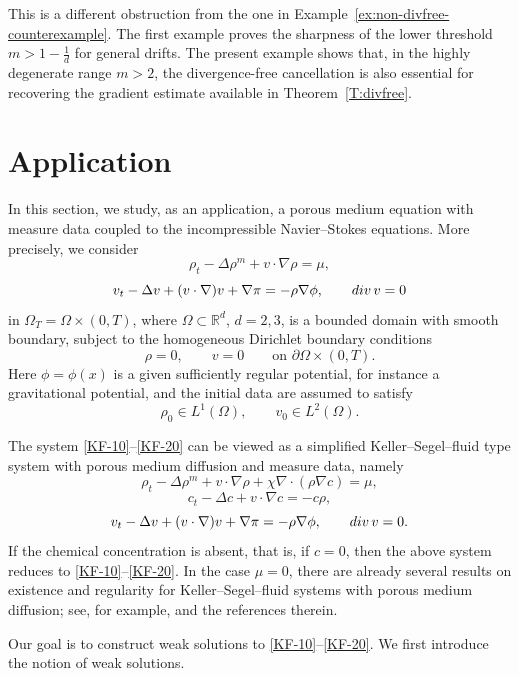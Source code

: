 \documentclass{amsart}
\numberwithin{equation}{section}
\begin{document}
This is a different obstruction from the one in
Example~\ref{ex:non-divfree-counterexample}. The first example proves the
sharpness of the lower threshold \(m>1-\frac{1}{d}\) for general drifts. The
present example shows that, in the highly degenerate range \(m>2\), the
divergence-free cancellation is also essential for recovering the gradient
estimate available in Theorem~\ref{T:divfree}.




\section{Application}\label{S:Application}

In this section, we study, as an application, a porous medium equation with measure data coupled to the incompressible Navier--Stokes equations. More precisely, we consider
\begin{equation}\label{KF-10}
\rho_t-\Delta \rho^m +v\cdot \nabla \rho=\mu,
\end{equation}
\begin{equation}\label{KF-20}
v_t-\Delta v +(v\cdot \nabla) v+\nabla \pi=-\rho\nabla\phi,
\qquad {\rm div}\,v=0
\end{equation}
in $\Omega_T=\Omega\times (0, T)$, where $\Omega\subset\mathbb R^d$, $d=2,3$, is a bounded domain with smooth boundary, subject to the homogeneous Dirichlet boundary conditions
\[
\rho=0,\qquad v=0
\qquad \text{on } \partial\Omega\times(0,T).
\]
Here $\phi=\phi(x)$ is a given sufficiently regular potential, for instance a gravitational potential, and the initial data are assumed to satisfy
\[
\rho_0\in L^1(\Omega),
\qquad
v_0\in L^2(\Omega).
\]

The system \eqref{KF-10}--\eqref{KF-20} can be viewed as a simplified Keller--Segel--fluid type system with porous medium diffusion and measure data, namely
\[
\rho_t-\Delta \rho^m +v\cdot \nabla \rho+\chi\nabla\cdot(\rho\nabla c)=\mu,
\]
\[
c_t-\Delta c +v\cdot \nabla c=-c\rho,
\]
\[
v_t-\Delta v +(v\cdot \nabla) v+\nabla \pi=-\rho\nabla\phi,
\qquad {\rm div}\,v=0.
\]
If the chemical concentration is absent, that is, if $c=0$, then the above system reduces to \eqref{KF-10}--\eqref{KF-20}. In the case $\mu=0$, there are already several results on existence and regularity for Keller--Segel--fluid systems with porous medium diffusion; see, for example, \cite{CHKK17, HKK02, HZ21, Win15} and the references therein.

Our goal is to construct weak solutions to \eqref{KF-10}--\eqref{KF-20}. We first introduce the notion of weak solutions.
\end{document}
